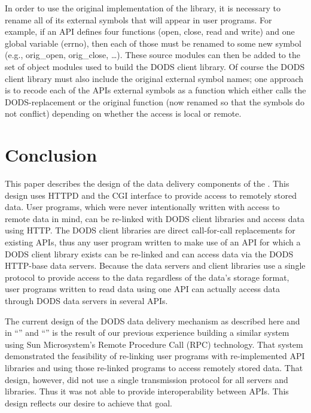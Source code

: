 In order to use the original implementation of the library, it is necessary to
rename all of its external symbols that will appear in user programs. For
example, if an API defines four functions (open, close, read and write) and
one global variable (errno), then each of those must be renamed to some new
symbol (e.g., orig\_open, orig\_close, \ldots). These source modules can then
be added to the set of object modules used to build the DODS client
library. Of course the DODS client library must also include the original
external symbol names; one approach is to recode each of the APIs external
symbols as a function which either calls the DODS-replacement or the original
function (now renamed so that the symbols do not conflict) depending on
whether the access is local or remote.

\section{Conclusion}

This paper describes the design of the data delivery components of the \DODS\@.
This design uses HTTPD and the CGI interface to provide access to remotely
stored data. User programs, which were never intentionally written with
access to remote data in mind, can be re-linked with DODS client libraries
and access data using HTTP\@. The DODS client libraries are direct
call-for-call replacements for existing APIs, thus any user program written
to make use of an API for which a DODS client library exists can be re-linked
and can access data via the DODS HTTP-base data servers. Because the data
servers and client libraries use a single protocol to provide access to the
data regardless of the data's storage format, user programs written to read
data using one API can actually access data through DODS data servers in
several APIs.

The current design of the DODS data delivery mechanism as described here and
in ``\DDA'' and ``\DAP'' is the result of our previous experience building a
similar system using Sun Microsystem's Remote Procedure Call (RPC)
technology. That system demonstrated the feasibility of re-linking user
programs with re-implemented API libraries and using those re-linked programs
to access remotely stored data. That design, however, did not use a single
transmission protocol for all servers and libraries. Thus it was not able to
provide interoperability between APIs. This design reflects our desire to
achieve that goal. 

